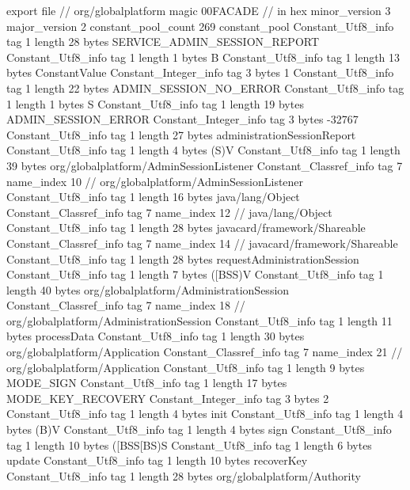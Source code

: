 export file {		// org/globalplatform
	magic	00FACADE		 // in hex
	minor_version	3
	major_version	2
	constant_pool_count	269
	constant_pool {
		Constant_Utf8_info {
			tag	1
			length	28
			bytes	SERVICE_ADMIN_SESSION_REPORT
		}
		Constant_Utf8_info {
			tag	1
			length	1
			bytes	B
		}
		Constant_Utf8_info {
			tag	1
			length	13
			bytes	ConstantValue
		}
		Constant_Integer_info {
			tag	3
			bytes	1
		}
		Constant_Utf8_info {
			tag	1
			length	22
			bytes	ADMIN_SESSION_NO_ERROR
		}
		Constant_Utf8_info {
			tag	1
			length	1
			bytes	S
		}
		Constant_Utf8_info {
			tag	1
			length	19
			bytes	ADMIN_SESSION_ERROR
		}
		Constant_Integer_info {
			tag	3
			bytes	-32767
		}
		Constant_Utf8_info {
			tag	1
			length	27
			bytes	administrationSessionReport
		}
		Constant_Utf8_info {
			tag	1
			length	4
			bytes	(S)V
		}
		Constant_Utf8_info {
			tag	1
			length	39
			bytes	org/globalplatform/AdminSessionListener
		}
		Constant_Classref_info {
			tag	7
			name_index	10		// org/globalplatform/AdminSessionListener
		}
		Constant_Utf8_info {
			tag	1
			length	16
			bytes	java/lang/Object
		}
		Constant_Classref_info {
			tag	7
			name_index	12		// java/lang/Object
		}
		Constant_Utf8_info {
			tag	1
			length	28
			bytes	javacard/framework/Shareable
		}
		Constant_Classref_info {
			tag	7
			name_index	14		// javacard/framework/Shareable
		}
		Constant_Utf8_info {
			tag	1
			length	28
			bytes	requestAdministrationSession
		}
		Constant_Utf8_info {
			tag	1
			length	7
			bytes	([BSS)V
		}
		Constant_Utf8_info {
			tag	1
			length	40
			bytes	org/globalplatform/AdministrationSession
		}
		Constant_Classref_info {
			tag	7
			name_index	18		// org/globalplatform/AdministrationSession
		}
		Constant_Utf8_info {
			tag	1
			length	11
			bytes	processData
		}
		Constant_Utf8_info {
			tag	1
			length	30
			bytes	org/globalplatform/Application
		}
		Constant_Classref_info {
			tag	7
			name_index	21		// org/globalplatform/Application
		}
		Constant_Utf8_info {
			tag	1
			length	9
			bytes	MODE_SIGN
		}
		Constant_Utf8_info {
			tag	1
			length	17
			bytes	MODE_KEY_RECOVERY
		}
		Constant_Integer_info {
			tag	3
			bytes	2
		}
		Constant_Utf8_info {
			tag	1
			length	4
			bytes	init
		}
		Constant_Utf8_info {
			tag	1
			length	4
			bytes	(B)V
		}
		Constant_Utf8_info {
			tag	1
			length	4
			bytes	sign
		}
		Constant_Utf8_info {
			tag	1
			length	10
			bytes	([BSS[BS)S
		}
		Constant_Utf8_info {
			tag	1
			length	6
			bytes	update
		}
		Constant_Utf8_info {
			tag	1
			length	10
			bytes	recoverKey
		}
		Constant_Utf8_info {
			tag	1
			length	28
			bytes	org/globalplatform/Authority
}}}
